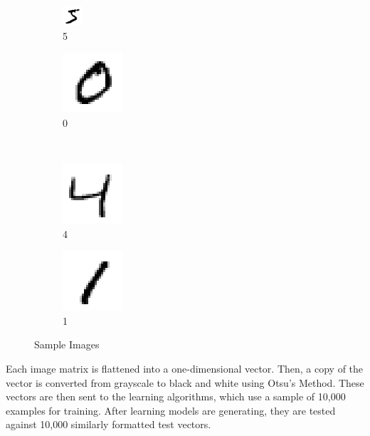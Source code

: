 \documentclass[12pt]{article}
\begin{document}
\begin{figure}[h]
\centering
\begin{subfigure}{.25\textwidth}
  \centering
  \includegraphics[width=.2\linewidth]{0.png}
  \caption{5}
  \label{fig:sub1}
\end{subfigure}%
\hspace{4mm}
\begin{subfigure}{.25\textwidth}
  \centering
  \includegraphics[width=.2\linewidth]{1.png}
  \caption{0}
  \label{fig:sub2}
\end{subfigure}
\\
\begin{subfigure}{.25\textwidth}
  \centering
  \includegraphics[width=.2\linewidth]{2.png}
  \caption{4}
  \label{fig:sub3}
\end{subfigure}
\begin{subfigure}{.25\textwidth}
  \centering
  \includegraphics[width=.2\linewidth]{3.png}
  \caption{1}
  \label{fig:sub4}
\end{subfigure}
\caption{Sample Images}
\label{fig:test}
\end{figure}

Each image matrix is flattened into a one-dimensional vector. Then, a copy of the vector is converted from grayscale to black and white using Otsu's Method. These vectors are then sent to the learning algorithms, which use a sample of 10,000 examples for training. After learning models are generating, they are tested against 10,000 similarly formatted test vectors.
\end{document}
